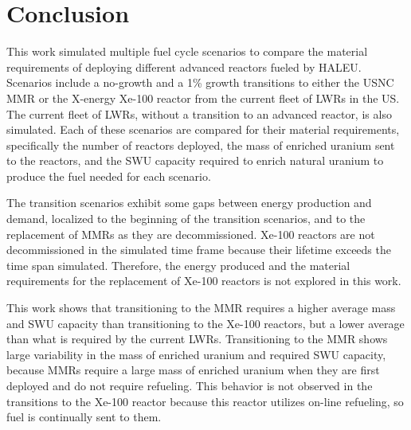 \documentclass[preprint]{elsarticle}
\providecommand{\DIFaddend}{} %
\begin{document}
\DIFaddend \section{Conclusion}
This work simulated multiple fuel cycle scenarios to compare the 
material requirements of deploying different advanced reactors fueled 
by \gls{HALEU}. Scenarios include a no-growth and a 1\% growth 
transitions to either the \gls{USNC} \gls{MMR} or the X-energy Xe-100 
reactor from the current fleet of \glspl{LWR} in the US. The current 
fleet of \glspl{LWR}, without a transition to an advanced reactor, is 
also simulated. Each of these scenarios are compared for their material 
requirements, specifically the number of reactors deployed, the mass 
of enriched uranium sent to the reactors, and the \gls{SWU} capacity 
required to enrich natural uranium to produce the fuel needed for 
each scenario. 

The transition scenarios exhibit some gaps between  
energy production and demand, localized to the beginning of the 
transition
scenarios, and to the replacement of \glspl{MMR} as they are decommissioned. 
Xe-100 reactors are not decommissioned in the simulated time frame because 
their lifetime exceeds the time span simulated. Therefore, the 
energy produced and the material requirements for the replacement of 
Xe-100 reactors is not explored in this work. 

This work shows that transitioning to the \gls{MMR} requires 
a higher average mass and \gls{SWU} capacity than transitioning to the 
Xe-100 reactors, but a lower average than what is required by the current 
\glspl{LWR}. Transitioning to the \gls{MMR} shows large variability in 
the mass of enriched uranium and required \gls{SWU} capacity, because 
\glspl{MMR} require a large mass of enriched uranium when they are 
first deployed and do not require refueling. This behavior is not observed 
in the transitions to the Xe-100 reactor because this reactor utilizes 
on-line refueling, so fuel is continually sent to them. 
\end{document}
